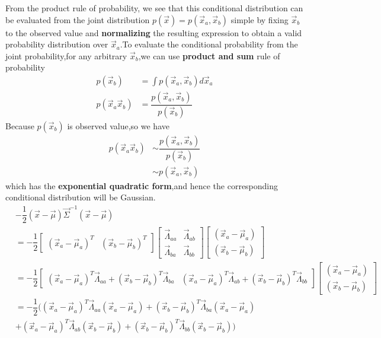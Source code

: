 From the product rule of probability, we see that this conditional distribution can be evaluated from the joint distribution $p(\vec{x}) = p(\vec{x}_a,\vec{x}_b)$ simple by fixing $\vec{x}_b$ to the observed value and \textbf{normalizing} the resulting expression to obtain a valid probability distribution over $\vec{x}_a$.To evaluate the conditional probability from the joint probability,for any arbitrary $\vec{x}_b$,we can use \textbf{product and sum} rule of probability
\begin{align}
p(\vec{x}_b) &= \int p(\vec{x}_a,\vec{x}_b) d\vec{x}_a \\
p(\vec{x}_a\vec{x}_b) &= \dfrac{p(\vec{x}_a,\vec{x}_b)}{p(\vec{x}_b)}
\end{align}
Because $p(\vec{x}_b)$ is observed value,so we have
\begin{align}
p(\vec{x}_a\vec{x}_b) &\sim \dfrac{p(\vec{x}_a,\vec{x}_b)}{p(\vec{x}_b)} \\
&\sim p(\vec{x}_a,\vec{x}_b)
\end{align}
which has the \textbf{exponential quadratic form},and hence the corresponding conditional distribution will be Gaussian.
\begin{align}
&-\dfrac{1}{2}(\vec{x}-\vec{\mu})\vec{\Sigma}^{-1}(\vec{x}-\vec{\mu}) \\
&=-\dfrac{1}{2}\left[ \begin{array}{cc} 
(\vec{x}_a-\vec{\mu}_a)^T & (\vec{x}_b-\vec{\mu}_b)^T 
\end{array}\right]
\left[ \begin{array}{cc} 
\vec{\varLambda}_{aa} & \vec{\varLambda}_{ab}  \\
\vec{\varLambda}_{ba} & \vec{\varLambda}_{bb}    
\end{array}\right]
\left[ \begin{array}{cc} 
(\vec{x}_a-\vec{\mu}_a) \\
(\vec{x}_b-\vec{\mu}_b)
\end{array}\right] \\
&=-\dfrac{1}{2}\left[ \begin{array}{cc} 
(\vec{x}_a-\vec{\mu}_a)^T\vec{\varLambda}_{aa}+(\vec{x}_b-\vec{\mu}_b)^T\vec{\varLambda}_{ba} &
(\vec{x}_a-\vec{\mu}_a)^T\vec{\varLambda}_{ab}+(\vec{x}_b-\vec{\mu}_b)^T\vec{\varLambda}_{bb}    
\end{array}\right]
\left[ \begin{array}{cc} 
(\vec{x}_a-\vec{\mu}_a) \\
(\vec{x}_b-\vec{\mu}_b)
\end{array}\right] \\
&=-\dfrac{1}{2}((\vec{x}_a-\vec{\mu}_a)^T\vec{\varLambda}_{aa}(\vec{x}_a-\vec{\mu}_a)
+(\vec{x}_b-\vec{\mu}_b)^T\vec{\varLambda}_{ba}(\vec{x}_a-\vec{\mu}_a) \\
&+ (\vec{x}_a-\vec{\mu}_a)^T\vec{\varLambda}_{ab}(\vec{x}_b-\vec{\mu}_b)
+(\vec{x}_b-\vec{\mu}_b)^T\vec{\varLambda}_{bb}(\vec{x}_b-\vec{\mu}_b) )
\end{align}

